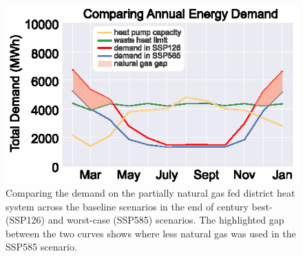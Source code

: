 \documentclass[twocolumn, a4paper,10pt]{article}
\begin{document}
\begin{figure}[hbpt]
    \centering
    \includegraphics[scale=1.15]{figures/district_heat_charts.eps}
    \caption{Comparing the demand on the partially natural gas fed district heat system across the baseline scenarios in the end of century best- (SSP126) and worst-case (SSP585) scenarios. The highlighted gap between the two curves shows where less natural gas was used in the SSP585 scenario.}
    \label{fig:compare_district}
\end{figure}
\end{document}
